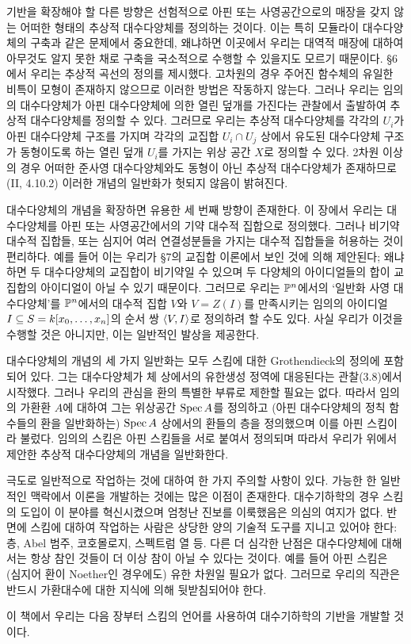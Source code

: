 	기반을 확장해야 할 다른 방향은 선험적으로 아핀 또는 사영공간으로의 매장을 갖지 않는
	어떠한 형태의 추상적 대수다양체를 정의하는 것이다. 이는 특히 모듈라이 대수다양체의 구축과 같은 문제에서 중요한데,
	왜냐하면 이곳에서 우리는 대역적 매장에 대하여 아무것도 알지 못한 채로 구축을 국소적으로 수행할 수 있을지도 모르기 때문이다.
	\S 6에서 우리는 추상적 곡선의 정의를 제시했다.
	고차원의 경우 주어진 함수체의 유일한 비특이 모형이 존재하지 않으므로 이러한 방법은 작동하지 않는다.
	그러나 우리는 임의의 대수다양체가 아핀 대수다양체에 의한 열린 덮개를 가진다는 관찰에서 출발하여 추상적 대수다양체를 정의할 수 있다.
	그러므로 우리는 추상적 대수다양체를 각각의 $U_i$가 아핀 대수다양체 구조를 가지며 각각의 교집합 $U_i\cap U_j$ 상에서
	유도된 대수다양체 구조가 동형이도록 하는 열린 덮개 $U_i$를 가지는 위상 공간 $X$로 정의할 수 있다.
	2차원 이상의 경우 어떠한 준사영 대수다양체와도 동형이 아닌 추상적 대수다양체가 존재하므로 (II, 4.10.2)
	이러한 개념의 일반화가 헛되지 않음이 밝혀진다.
	
	대수다양체의 개념을 확장하면 유용한 세 번째 방향이 존재한다.
	이 장에서 우리는 대수다양체를 아핀 또는 사영공간에서의 기약 대수적 집합으로 정의했다.
	그러나 비기약 대수적 집합들, 또는 심지어 여러 연결성분들을 가지는 대수적 집합들을 허용하는 것이 편리하다.
	예를 들어 이는 우리가 \S 7의 교집합 이론에서 보인 것에 의해 제안된다;
	왜냐하면 두 대수다양체의 교집합이 비기약일 수 있으며 두 다양체의 아이디얼들의 합이 교집합의 아이디얼이 아닐 수 있기 때문이다.
	그러므로 우리는 $\mathbb{P}^n$에서의 `일반화 사영 대수다양체'를 $\mathbb{P}^n$에서의 대수적 집합 $V$와 $V=Z(I)$를 만족시키는
	임의의 아이디얼 $I\subseteq S=k[x_0,\ldots,x_n]$의 순서 쌍 $\Braket{V,I}$로 정의하려 할 수도 있다.
	사실 우리가 이것을 수행할 것은 아니지만, 이는 일반적인 발상을 제공한다.
	
	대수다양체의 개념의 세 가지 일반화는 모두 스킴에 대한 Grothendieck의 정의에 포함되어 있다.
	그는 대수다양체가 체 상에서의 유한생성 정역에 대응된다는 관찰(3.8)에서 시작했다.
	그러나 우리의 관심을 환의 특별한 부류로 제한할 필요는 없다.
	따라서 임의의 가환환 $A$에 대하여 그는 위상공간 $\operatorname{Spec} A$를 정의하고
	(아핀 대수다양체의 정칙 함수들의 환을 일반화하는) $\operatorname{Spec} A$ 상에서의 환들의 층을 정의했으며 이를 아핀 스킴이라 불렀다.
	임의의 스킴은 아핀 스킴들을 서로 붙여서 정의되며 따라서 우리가 위에서 제안한 추상적 대수다양체의 개념을 일반화한다.
	
	극도로 일반적으로 작업하는 것에 대하여 한 가지 주의할 사항이 있다.
	가능한 한 일반적인 맥락에서 이론을 개발하는 것에는 많은 이점이 존재한다.
	대수기하학의 경우 스킴의 도입이 이 분야를 혁신시켰으며 엄청난 진보를 이룩했음은 의심의 여지가 없다.
	반면에 스킴에 대하여 작업하는 사람은 상당한 양의 기술적 도구를 지니고 있어야 한다:
	층, Abel 범주, 코호몰로지, 스펙트럼 열 등.
	다른 더 심각한 난점은 대수다양체에 대해서는 항상 참인 것들이 더 이상 참이 아닐 수 있다는 것이다.
	예를 들어 아핀 스킴은 (심지어 환이 Noether인 경우에도) 유한 차원일 필요가 없다.
	그러므로 우리의 직관은 반드시 가환대수에 대한 지식에 의해 뒷받침되어야 한다.
	
	이 책에서 우리는 다음 장부터 스킴의 언어를 사용하여 대수기하학의 기반을 개발할 것이다.
	
	
	
	
	
	
	
	
	
	
	
	
	
	
	
	
	
	
	
	
	
	
	
	
	